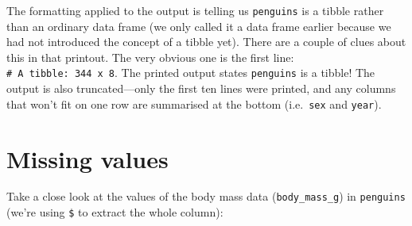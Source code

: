\documentclass[
]{book}
\newenvironment{Shaded}{\begin{snugshade}}{\end{snugshade}}
\newcommand{\NormalTok}[1]{#1}
\newcommand{\SpecialCharTok}[1]{\textcolor[rgb]{0.00,0.00,0.00}{#1}}
\begin{document}
The formatting applied to the output is telling us \texttt{penguins} is a tibble rather than an ordinary data frame (we only called it a data frame earlier because we had not introduced the concept of a tibble yet). There are a couple of clues about this in that printout. The very obvious one is the first line: \texttt{\#\ A\ tibble:\ 344\ x\ 8}. The printed output states \texttt{penguins} is a tibble! The output is also truncated---only the first ten lines were printed, and any columns that won't fit on one row are summarised at the bottom (i.e.~\texttt{sex} and \texttt{year}).

\hypertarget{missing-values}{%
\section{Missing values}\label{missing-values}}

Take a close look at the values of the body mass data (\texttt{body\_mass\_g}) in \texttt{penguins} (we're using \texttt{\$} to extract the whole column):

\begin{Shaded}
\end{Shaded}
\end{document}
